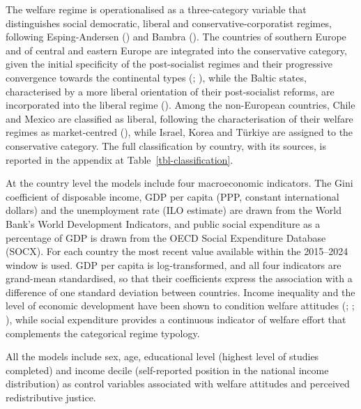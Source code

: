 \documentclass[
  12pt,
]{article}
\begin{document}
The welfare regime is operationalised as a three-category variable that
distinguishes social democratic, liberal and conservative-corporatist
regimes, following Esping-Andersen
() and Bambra
(). The countries of southern
Europe and of central and eastern Europe are integrated into the
conservative category, given the initial specificity of the
post-socialist regimes and their progressive convergence towards the
continental types (;
), while the Baltic
states, characterised by a more liberal orientation of their
post-socialist reforms, are incorporated into the liberal regime
(). Among the
non-European countries, Chile and Mexico are classified as liberal,
following the characterisation of their welfare regimes as
market-centred (), while Israel, Korea and Türkiye are assigned to the conservative
category. The full classification by country, with its sources, is
reported in the appendix at Table~\ref{tbl-classification}.

At the country level the models include four macroeconomic indicators.
The Gini coefficient of disposable income, GDP per capita (PPP, constant
international dollars) and the unemployment rate (ILO estimate) are
drawn from the World Bank's World Development Indicators, and public
social expenditure as a percentage of GDP is drawn from the OECD Social
Expenditure Database (SOCX). For each country the most recent value
available within the 2015--2024 window is used. GDP per capita is
log-transformed, and all four indicators are grand-mean standardised, so
that their coefficients express the association with a difference of one
standard deviation between countries. Income inequality and the level of
economic development have been shown to condition welfare attitudes
(;
;
),
while social expenditure provides a continuous indicator of welfare
effort that complements the categorical regime typology.

All the models include sex, age, educational level (highest level of
studies completed) and income decile (self-reported position in the
national income distribution) as control variables associated with
welfare attitudes and perceived redistributive justice.
\end{document}
